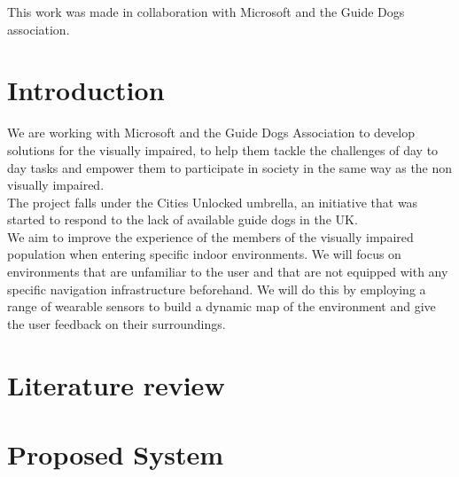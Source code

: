 \documentclass[prodmode,acmtecs]{acmsmall} %
\begin{document}


\begin{bottomstuff}
This work was made in collaboration with Microsoft and the Guide Dogs association.
\end{bottomstuff}

\maketitle

\section{Introduction}
We are working with Microsoft and the Guide Dogs Association to develop solutions for the visually impaired, to help them tackle the challenges of day to day tasks and empower them to participate in society in the same way as the non visually impaired.\\
The project falls under the Cities Unlocked 
umbrella, an initiative that was started to respond to the lack of available guide dogs in the UK.\\
We aim to improve the experience of the members of the visually impaired population when entering specific indoor environments.
We will focus on environments that are unfamiliar to the user and that are not equipped with any specific navigation infrastructure beforehand.
We will do this by employing a range of wearable  sensors to build a dynamic map of the environment and give the user feedback on their surroundings.

\section{Literature review}

\section{Proposed System}
\end{document}
